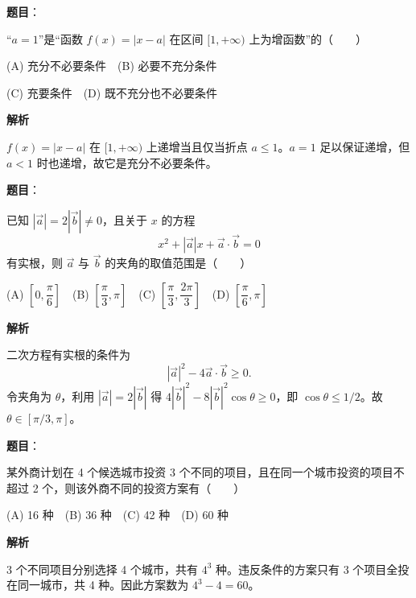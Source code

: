 \begin{answer}

\textbf{题目}：

“$a=1$”是“函数 $f(x)=|x-a|$ 在区间 $[1,+\infty)$ 上为增函数”的\mbox{（　　）}

(A) 充分不必要条件　(B) 必要不充分条件

(C) 充要条件　(D) 既不充分也不必要条件

\textbf{解析}

$f(x)=|x-a|$ 在 $[1,+\infty)$ 上递增当且仅当折点 $a\le1$。$a=1$ 足以保证递增，但 $a<1$ 时也递增，故它是充分不必要条件。


\end{answer}
\begin{answer}

\textbf{题目}：

已知 $|\vec a|=2|\vec b|\ne0$，且关于 $x$ 的方程
\nopagebreak[4]
\[
x^2+|\vec a|x+\vec a\cdot\vec b=0
\]
有实根，则 $\vec a$ 与 $\vec b$ 的夹角的取值范围是\mbox{（　　）}

(A) $\left[0,\dfrac\pi6\right]$　(B) $\left[\dfrac\pi3,\pi\right]$　(C) $\left[\dfrac\pi3,\dfrac{2\pi}3\right]$　(D) $\left[\dfrac\pi6,\pi\right]$

\textbf{解析}

二次方程有实根的条件为
\nopagebreak[4]
\[
|\vec a|^2-4\vec a\cdot\vec b\ge0.
\]
令夹角为 $\theta$，利用 $|\vec a|=2|\vec b|$ 得 $4|\vec b|^2-8|\vec b|^2\cos\theta\ge0$，即 $\cos\theta\le1/2$。故 $\theta\in[\pi/3,\pi]$。


\end{answer}
\begin{answer}

\textbf{题目}：

某外商计划在 4 个候选城市投资 3 个不同的项目，且在同一个城市投资的项目不超过 2 个，则该外商不同的投资方案有\mbox{（　　）}

(A) 16 种　(B) 36 种　(C) 42 种　(D) 60 种

\textbf{解析}

3 个不同项目分别选择 4 个城市，共有 $4^3$ 种。违反条件的方案只有 3 个项目全投在同一城市，共 4 种。因此方案数为 $4^3-4=60$。


\end{answer}
